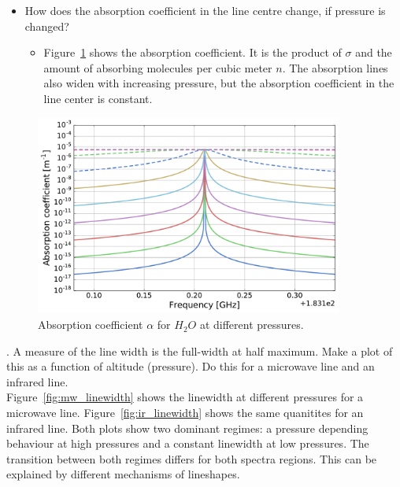 \documentclass[paper=a4, fontsize=11pt]{scrartcl} %
\begin{document}
\begin{itemize}
  \item How does the absorption coefficient in the line centre change, if 
pressure is changed?
    \begin{itemize}
      \item Figure~\ref{fig:abs_coeff} shows the absorption coefficient. It is 
      the product of $\sigma$ and the amount of absorbing molecules per cubic meter 
      $n$. The absorption lines also widen with increasing pressure, but the 
      absorption coefficient in the line center is constant.
    \end{itemize}
\end{itemize}
\vfill
\begin{figure}[h!]
  \centering
  \includegraphics[width=0.9\textwidth]{plots/line_center.pdf}
  \caption{Absorption coefficient $\alpha$ for $H_2O$ at different pressures.}
  \label{fig:abs_coeff}
\end{figure}

. A measure of the line width is the full-width at half maximum. Make a plot of 
this as a function of altitude (pressure). Do this for a microwave line and an 
infrared line.\\

Figure~\ref{fig:mw_linewidth} shows the linewidth at different pressures for a 
microwave line. Figure~\ref{fig:ir_linewidth} shows the same quanitites for an 
infrared line. Both plots show two dominant regimes: a pressure depending 
behaviour at high pressures and a constant linewidth at low pressures. The 
transition between both regimes differs for both spectra regions. This can be 
explained by different mechanisms of lineshapes.
\end{document}
